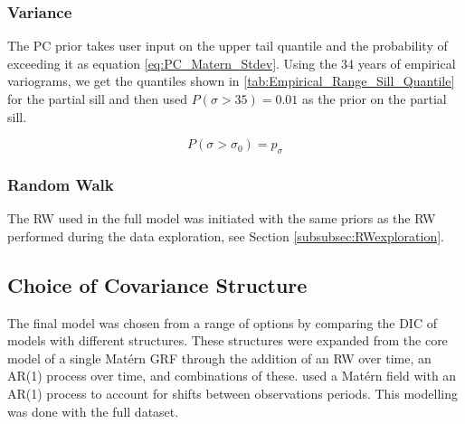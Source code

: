 \subsubsection*{Variance}
\label{subsubsec:variance}
The PC prior takes user input on the upper tail quantile and the probability of exceeding it as equation \ref{eq:PC_Matern_Stdev}.  Using the 34 years of empirical variograms, we get the quantiles shown in \ref{tab:Empirical_Range_Sill_Quantile} for the partial sill and then used $P(\sigma > 35) = 0.01$ as the prior on the partial sill.

\begin{equation}
	P(\sigma > \sigma_0) = p_{\sigma}    
\end{equation} \label{eq:PC_Matern_Stdev}

\subsubsection{Random Walk}
\label{subsubsec:ranwalk}
The \ac{RW} used in the full model was initiated with the same priors as the \ac{RW} performed during the data exploration, see Section \ref{subsubsec:RWexploration}.


\subsection{Choice of Covariance Structure}
\label{subsec:covstructchoice}
The final model was chosen from a range of options by comparing the DIC of models with different structures.  These structures were expanded from the core model of a single Mat\'{e}rn \ac{GRF} through the addition of an RW over time, an AR(1) process over time, and combinations of these.  \cite{cameletti2011spatio} used a Mat\'{e}rn field with an AR(1) process to account for shifts between observations periods.  This modelling was done with the full dataset.

